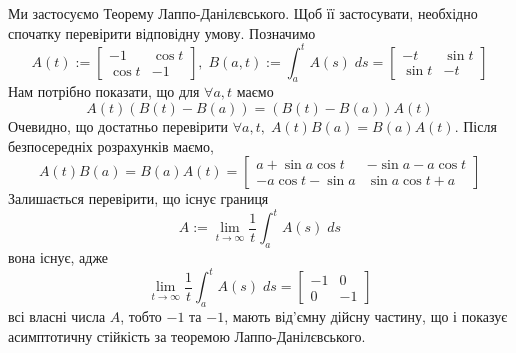 \documentclass[10pt]{article}
\begin{document}
Ми застосуємо Теорему Лаппо-Данілєвського. Щоб її застосувати, необхідно спочатку перевірити відповідну умову. Позначимо
\[A(t):=\begin{bmatrix}-1&\cos t\\\cos t&-1\end{bmatrix},\;B(a,t):=\int_a^tA(s)\;ds=\begin{bmatrix}-t&\sin t\\\sin t&-t\end{bmatrix}\]
Нам потрібно показати, що для $\forall a,t$ маємо
\[A(t)(B(t)-B(a))=(B(t)-B(a))A(t)\]
Очевидно, що достатньо перевірити $\forall a,t,\;A(t)B(a)=B(a)A(t)$. Після безпосередніх розрахунків маємо,
\[A(t)B(a)=B(a)A(t)=\begin{bmatrix}a+\sin a\cos t&-\sin a-a\cos t\\-a\cos t-\sin a&\sin a\cos t+a\end{bmatrix}\]
Залишається перевірити, що існує границя
\[A:=\lim_{t\to\infty}\frac{1}{t}\int_a^tA(s)\;ds\]
вона існує, адже
\[\lim_{t\to\infty}\frac{1}{t}\int_a^tA(s)\;ds=\begin{bmatrix}-1&0\\0&-1\end{bmatrix}\]
всі власні числа $A$, тобто $-1$ та $-1$, мають від’ємну дійсну частину, що і показує асимптотичну стійкість за теоремою Лаппо-Данілєвського.
\end{document}
